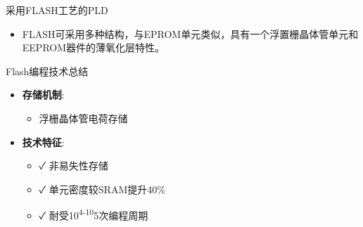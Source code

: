 \documentclass[
  ignorenonframetext,
  chinese,
]{beamer}
\providecommand{\tightlist}{%
  \setlength{\itemsep}{0pt}\setlength{\parskip}{0pt}}
\begin{document}
\begin{frame}
\begin{block}{采用FLASH工艺的PLD}
\begin{itemize}
  \begin{itemize}
  \tightlist
  \item
    FLASH可采用多种结构，与EPROM单元类似，具有一个浮置栅晶体管单元和EEPROM器件的薄氧化层特性。
  \end{itemize}
\end{itemize}
\end{block}
\end{frame}

\begin{frame}
\begin{block}{Flash编程技术总结}
\label{flashux7f16ux7a0bux6280ux672fux603bux7ed3}
\begin{itemize}
\tightlist
\item
  \textbf{存储机制}:

  \begin{itemize}
  \tightlist
  \item
    浮栅晶体管电荷存储
  \end{itemize}
\item
  \textbf{技术特征}:

  \begin{itemize}
  \tightlist
  \item
    ✓ 非易失性存储\\
  \item
    ✓ 单元密度较SRAM提升40\%\\
  \item
    ✓ 耐受10\textsuperscript{4-10}5次编程周期
  \end{itemize}
\end{itemize}
\end{block}
\end{frame}
\end{document}
